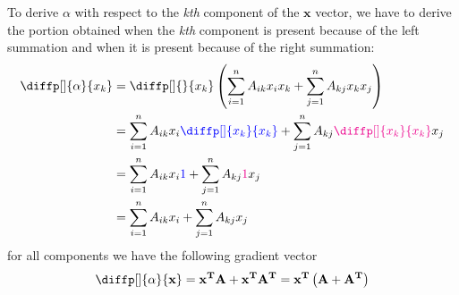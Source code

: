 \documentclass[12pt]{article}
\newcommand{\bvec}[1]{\mathbf{#1}} %
\newcommand{\bvecT}[1]{\mathbf{#1^T}} %
\newcommand{\mat}[1]{\mathbf{#1}}
\newcommand{\matT}[1]{\mathbf{#1^T}}
\newcommand{\parentheses}[1]{\left(#1\right)}
\newcommand{\Sum}[3][i]{\sum\limits_{#1 = #2}^{#3}}
\newcommand{\blue}[1]{\color{blue}#1\color{black}}
\newcommand{\magenta}[1]{\color{magenta}#1\color{black}}
\begin{document}
To derive $\alpha$ with respect to the \textit{kth} component of the $\bvec{x}$ vector, we have to derive the portion obtained when the \textit{kth} component is present because of the left summation and when it is present because of the right summation:
\begin{equation}
\begin{aligned}
    \diffp[]{\alpha}{x_k} &= \diffp[]{}{x_k} \parentheses{\Sum{1}{n} A_{ik}x_i x_k + \Sum[j]{1}{n} A_{kj}x_k x_j} \\
    &= \Sum{1}{n} A_{ik}x_i \blue{\diffp[]{x_k}{x_k}} + \Sum[j]{1}{n} A_{kj}\magenta{\diffp[]{x_k}{x_k}} x_j\\
    &= \Sum{1}{n} A_{ik}x_i \blue{1} + \Sum[j]{1}{n} A_{kj}\magenta{1} x_j\\
    &= \Sum{1}{n} A_{ik}x_i + \Sum[j]{1}{n} A_{kj} x_j\\
\end{aligned}
\label{}
\end{equation}
for all components we have the following gradient vector
\begin{equation}
    \diffp[]{\alpha}{\bvec{x}} = \bvecT{x}\mat{A} + \bvecT{x}\matT{A} = \bvecT{x} \parentheses{\mat{A} + \matT{A}}
\end{equation}
\end{document}
